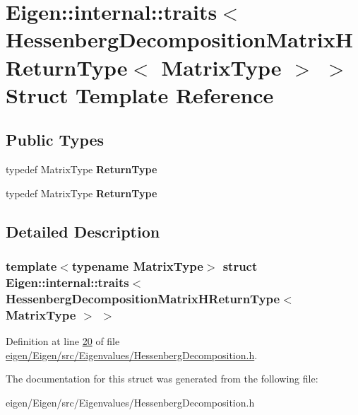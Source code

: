\hypertarget{struct_eigen_1_1internal_1_1traits_3_01_hessenberg_decomposition_matrix_h_return_type_3_01_matrix_type_01_4_01_4}{}\section{Eigen\+:\+:internal\+:\+:traits$<$ Hessenberg\+Decomposition\+Matrix\+H\+Return\+Type$<$ Matrix\+Type $>$ $>$ Struct Template Reference}
\label{struct_eigen_1_1internal_1_1traits_3_01_hessenberg_decomposition_matrix_h_return_type_3_01_matrix_type_01_4_01_4}
\subsection*{Public Types}
\begin{DoxyCompactItemize}
\item 
\mbox{\label{struct_eigen_1_1internal_1_1traits_3_01_hessenberg_decomposition_matrix_h_return_type_3_01_matrix_type_01_4_01_4_a61ecfbcb348b94ba026196609af64ca4}} 
typedef Matrix\+Type {\bfseries Return\+Type}
\item 
\mbox{\label{struct_eigen_1_1internal_1_1traits_3_01_hessenberg_decomposition_matrix_h_return_type_3_01_matrix_type_01_4_01_4_a61ecfbcb348b94ba026196609af64ca4}} 
typedef Matrix\+Type {\bfseries Return\+Type}
\end{DoxyCompactItemize}


\subsection{Detailed Description}
\subsubsection*{template$<$typename Matrix\+Type$>$\newline
struct Eigen\+::internal\+::traits$<$ Hessenberg\+Decomposition\+Matrix\+H\+Return\+Type$<$ Matrix\+Type $>$ $>$}



Definition at line \hyperlink{eigen_2_eigen_2src_2_eigenvalues_2_hessenberg_decomposition_8h_source_l00020}{20} of file \hyperlink{eigen_2_eigen_2src_2_eigenvalues_2_hessenberg_decomposition_8h_source}{eigen/\+Eigen/src/\+Eigenvalues/\+Hessenberg\+Decomposition.\+h}.



The documentation for this struct was generated from the following file\+:\begin{DoxyCompactItemize}
\item 
eigen/\+Eigen/src/\+Eigenvalues/\+Hessenberg\+Decomposition.\+h\end{DoxyCompactItemize}
